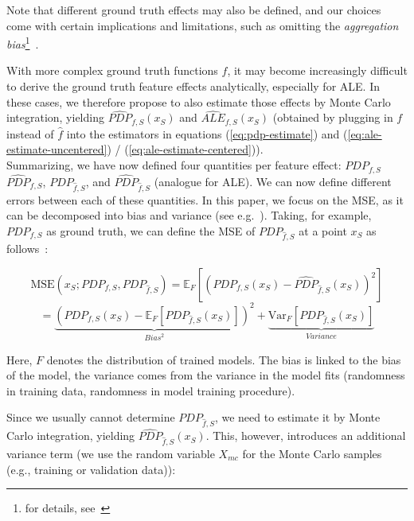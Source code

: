 \documentclass[runningheads]{llncs}
\begin{document}
Note that different ground truth effects may also be defined, and our choices
come with certain implications and limitations, such as omitting the
\textit{aggregation bias}\footnote{for details,
    see~\cite{herbinger_repid_2022}}~\cite{mehrabi_survey_2021}.

With more complex ground truth functions $f$, it may become increasingly
difficult to derive the ground truth feature effects analytically, especially
for ALE. In these cases, we therefore propose to also estimate those effects by  %
Monte Carlo integration, yielding $\widehat{PDP}_{f,S}(x_S)$ and
$\widehat{ALE}_{f,S}(x_S)$ (obtained by plugging in $f$ instead of $\hat f$
into the estimators in equations (\ref{eq:pdp-estimate}) and
(\ref{eq:ale-estimate-uncentered}) / (\ref{eq:ale-estimate-centered})).\\

\noindent Summarizing, we have now defined four quantities per feature effect:
$PDP_{f,S}$ $\widehat{PDP}_{f,S}$, $PDP_{\hat f,S}$, and $\widehat{PDP}_{\hat f,S}$
(analogue for ALE). We can now define different errors between each of these
quantities. In this paper, we focus on the MSE, as it can be decomposed into
bias and variance (see e.g.~\cite{geman_neural_1992}).
Taking, for example, $PDP_{f,S}$ as ground truth, we can define the MSE of
$PDP_{\hat f,S}$ at a point $x_S$ as follows~\cite{molnar_relating_2023}:

\begin{equation}
    \text{MSE}(x_S; PDP_{f,S}, PDP_{\hat f,S})
    = \mathbb{E}_F[{(PDP_{f,S}(x_S) - \widehat{PDP}_{\hat f,S}(x_S))}^2]
\end{equation}
\begin{equation}
    = \underbrace{{(PDP_{f,S}(x_S) - \mathbb{E}_F[PDP_{\hat{f},S}(x_S)])}^2}_{Bias^2} + \underbrace{\text{Var}_F[PDP_{\hat{f},S}(x_S)]}_{Variance}
\end{equation}

\noindent Here, $F$ denotes the distribution of trained models. The bias
is linked to the bias of the model, the variance comes from the variance
in the model fits (randomness in training data, randomness in model training procedure).

Since we usually cannot determine $PDP_{\hat f,S}$, we need to estimate it by
Monte Carlo integration, yielding $\widehat{PDP}_{\hat f,S}(x_S)$. This,
however, introduces an additional variance term (we use the random variable
$X_{mc}$ for the Monte Carlo samples (e.g., training or validation data)):
\end{document}
